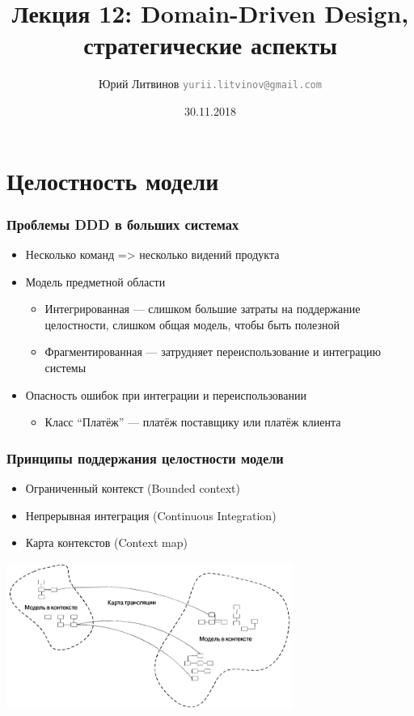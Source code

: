 \documentclass[xetex,mathserif,serif]{beamer}
\title{Лекция 12: Domain-Driven Design, стратегические аспекты}
\author[Юрий Литвинов]{Юрий Литвинов \newline \textcolor{gray}{\small\texttt{yurii.litvinov@gmail.com}}}
\date{30.11.2018}
\begin{document}
	
	\frame{\titlepage}

	\section{Целостность модели}

	\begin{frame}
		\frametitle{Проблемы DDD в больших системах}
		\begin{itemize}
			\item Несколько команд => несколько видений продукта
			\item Модель предметной области
			\begin{itemize}
				\item Интегрированная --- слишком большие затраты на поддержание целостности, слишком общая модель, чтобы быть полезной
				\item Фрагментированная --- затрудняет переиспользование и интеграцию системы
			\end{itemize}
			\item Опасность ошибок при интеграции и переиспользовании
			\begin{itemize}
				\item Класс ``Платёж'' --- платёж поставщику или платёж клиента
			\end{itemize}
		\end{itemize}
	\end{frame}

	\begin{frame}
		\frametitle{Принципы поддержания целостности модели}
		\begin{itemize}
			\item Ограниченный контекст (Bounded context)
			\item Непрерывная интеграция (Continuous Integration)
			\item Карта контекстов (Context map)
		\end{itemize}
		\begin{center}
			\includegraphics[width=0.7\textwidth]{contextMap.png}
		\end{center}
	\end{frame}
\end{document}
